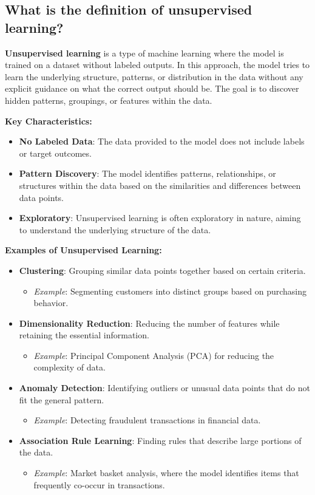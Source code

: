 \subsection{What is the definition of unsupervised learning?}
\textbf{Unsupervised learning} is a type of machine learning where the model is trained on a dataset without labeled outputs. In this approach, the model tries to learn the underlying structure, patterns, or distribution in the data without any explicit guidance on what the correct output should be. The goal is to discover hidden patterns, groupings, or features within the data.

\textbf{Key Characteristics:}
\begin{itemize}
    \item \textbf{No Labeled Data}: The data provided to the model does not include labels or target outcomes.
    \item \textbf{Pattern Discovery}: The model identifies patterns, relationships, or structures within the data based on the similarities and differences between data points.
    \item \textbf{Exploratory}: Unsupervised learning is often exploratory in nature, aiming to understand the underlying structure of the data.
\end{itemize}

\textbf{Examples of Unsupervised Learning:}
\begin{itemize}
    \item \textbf{Clustering}: Grouping similar data points together based on certain criteria.
    \begin{itemize}
        \item \textit{Example}: Segmenting customers into distinct groups based on purchasing behavior.
    \end{itemize}
    \item \textbf{Dimensionality Reduction}: Reducing the number of features while retaining the essential information.
    \begin{itemize}
        \item \textit{Example}: Principal Component Analysis (PCA) for reducing the complexity of data.
    \end{itemize}
    \item \textbf{Anomaly Detection}: Identifying outliers or unusual data points that do not fit the general pattern.
    \begin{itemize}
        \item \textit{Example}: Detecting fraudulent transactions in financial data.
    \end{itemize}
    \item \textbf{Association Rule Learning}: Finding rules that describe large portions of the data.
    \begin{itemize}
        \item \textit{Example}: Market basket analysis, where the model identifies items that frequently co-occur in transactions.
    \end{itemize}
\end{itemize}

